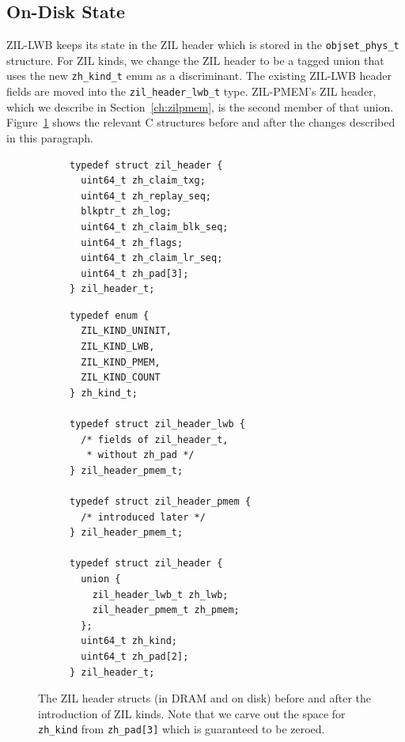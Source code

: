 \documentclass[12pt,a4paper,twoside]{book}
\begin{document}
\subsection{On-Disk State}\label{sec:di:zil_header}
ZIL-LWB keeps its state in the ZIL header which is stored in the \lstinline{objset_phys_t} structure.
For ZIL kinds, we change the ZIL header to be a tagged union that uses the new \lstinline{zh_kind_t} enum as a discriminant.
The existing ZIL-LWB header fields are moved into the \lstinline{zil_header_lwb_t} type.
ZIL-PMEM's ZIL header, which we describe in Section~\ref{ch:zilpmem}, is the second member of that union.
Figure~\ref{lst:zil_header_before_and_after} shows the relevant C structures before and after the changes described in this paragraph.

\begin{figure}[H]
\begin{subfigure}[t]{0.45\textwidth}
\begin{lstlisting}[basicstyle=\scriptsize\ttfamily]
typedef struct zil_header {
  uint64_t zh_claim_txg;
  uint64_t zh_replay_seq;
  blkptr_t zh_log;
  uint64_t zh_claim_blk_seq;
  uint64_t zh_flags;
  uint64_t zh_claim_lr_seq;
  uint64_t zh_pad[3];
} zil_header_t;
\end{lstlisting}
\end{subfigure}
\hfill
\begin{subfigure}[t]{0.5\textwidth}
\begin{lstlisting}[basicstyle=\scriptsize\ttfamily]
typedef enum {
  ZIL_KIND_UNINIT,
  ZIL_KIND_LWB,
  ZIL_KIND_PMEM,
  ZIL_KIND_COUNT
} zh_kind_t;

typedef struct zil_header_lwb {
  /* fields of zil_header_t,
   * without zh_pad */
} zil_header_pmem_t;

typedef struct zil_header_pmem {
  /* introduced later */
} zil_header_pmem_t;

typedef struct zil_header {
  union {
    zil_header_lwb_t zh_lwb;
    zil_header_pmem_t zh_pmem;
  };
  uint64_t zh_kind;
  uint64_t zh_pad[2];
} zil_header_t;

\end{lstlisting}
\end{subfigure}
\caption{The ZIL header structs (in DRAM and on disk) before and after the introduction of ZIL kinds. Note that we carve out the space for \lstinline{zh_kind} from \lstinline{zh_pad[3]} which is guaranteed to be zeroed.}
\label{lst:zil_header_before_and_after}
\end{figure}
\end{document}
